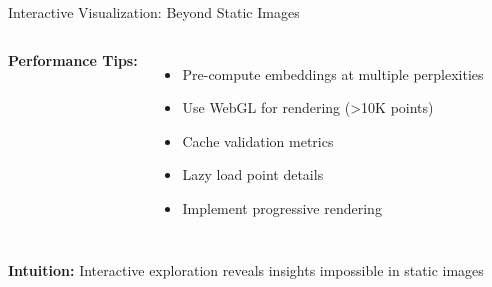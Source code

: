 \documentclass[aspectratio=169]{beamer}
\newcommand{\intuition}[1]{\colorbox{green!10}{\textcolor{intuitioncolor}{\textbf{Intuition:} #1}}}
\begin{document}
\begin{frame}{Interactive Visualization: Beyond Static Images}
\begin{columns}

\vspace{0.2cm}
\textbf{Performance Tips:}
\begin{itemize}
\item Pre-compute embeddings at multiple perplexities
\item Use WebGL for rendering (>10K points)
\item Cache validation metrics
\item Lazy load point details
\item Implement progressive rendering
\end{itemize}
\end{columns}

\vspace{0.3cm}
\intuition{Interactive exploration reveals insights impossible in static images}
\end{frame}
\end{document}
